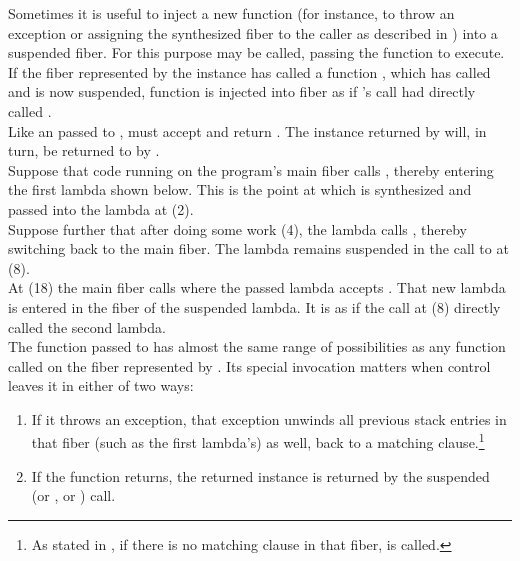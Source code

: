 \label{resumewith}
Sometimes it is useful to inject a new function (for instance, to throw an
exception or assigning the synthesized fiber to the caller as described in
) into a suspended fiber. For this purpose
 may be called, passing the function  to
execute.\\
If the fiber represented by the \fiber instance  has called a function
, which has called \resume and is now suspended, function
 is injected into fiber  as if 's \resume call
had directly called .\\

Like an \entryfn\xspace passed to \fiber,  must accept
 and return \fiber. The \fiber instance returned by 
will, in turn, be returned to  by \resume.\\

Suppose that code running on the program's main fiber calls \resume, thereby
entering the first lambda shown below. This is the point at which  is
synthesized and passed into the lambda at (2).\\
Suppose further that after doing some work (4), the lambda calls
, thereby switching back to the main fiber. The lambda remains
suspended in the call to  at (8).\\
At (18) the main fiber calls  where the passed lambda
accepts . That new lambda is entered in the fiber of the suspended
lambda. It is as if the  call at (8) directly called the second
lambda.\\

The function passed to \resumewith has almost the same range of possibilities as
any function called on the fiber represented by . Its special invocation
matters when control leaves it in either of two ways:

\begin{enumerate}
  \item If it throws an exception, that exception unwinds all previous stack
        entries in that fiber (such as the first lambda's) as well, back to
        a matching  clause.\footnote{As stated
        in , if there is no matching 
        clause in that fiber,  is called.}
  \item If the function returns, the returned \fiber instance is returned by
        the suspended  (or \entryfn, or \resumewith) call.
\end{enumerate}

